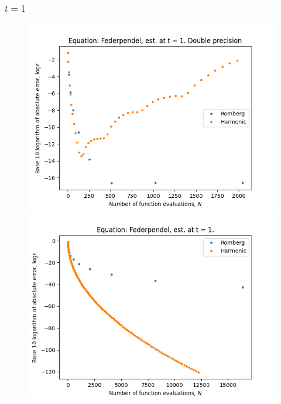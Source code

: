 \subsubsection{\(t = 1\)}

\begin{figure}[H]
\centering
\begin{minipage}{0.45\textwidth}
\centering
\includegraphics[scale=0.45]{../results/emr_plots/federpendel.png}
\end{minipage}
\begin{minipage}{0.45\textwidth}
\centering
\includegraphics[scale=0.45]{../results/emr_plots/federpendel_1_hp.png}
\end{minipage}
\end{figure}

